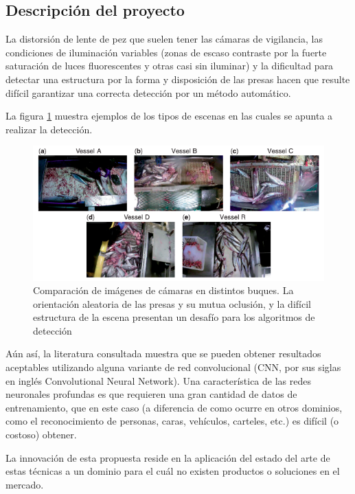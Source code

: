 \documentclass[11pt]{charter}
\begin{document}
\subsection{Descripción del proyecto}

La distorsión de lente de pez que suelen tener las cámaras de vigilancia, las condiciones de iluminación variables (zonas de escaso contraste por la fuerte saturación de luces fluorescentes y otras casi sin iluminar) y la dificultad para detectar una estructura por la forma y disposición de las presas hacen que resulte difícil garantizar una correcta detección por un método automático.

La figura \ref{fig:ejemplos_escenas} muestra ejemplos de los tipos de escenas en las cuales se apunta a realizar la detección.

\vspace{25px}

\begin{figure}[htpb]
\centering 
\includegraphics[width=.7\textwidth]{./Figuras/ejemplos_escenas.png}
\caption{Comparación de imágenes de cámaras en distintos buques. La orientación aleatoria de las presas y su mutua oclusión, y la difícil estructura de la escena presentan un desafío para los algoritmos de detección}
\label{fig:ejemplos_escenas}
\end{figure}

\vspace{25px}

Aún así, la literatura consultada muestra que se pueden obtener resultados aceptables utilizando alguna variante de red convolucional (CNN, por sus siglas en inglés Convolutional Neural Network). 
Una característica de las redes neuronales profundas es que requieren una gran cantidad de datos de entrenamiento, que en este caso (a diferencia de como ocurre en otros dominios, como el reconocimiento de personas, caras, vehículos, carteles, etc.) es difícil (o costoso) obtener.

La innovación de esta propuesta reside en la aplicación del estado del arte de estas técnicas a un dominio para el cuál no existen productos o soluciones en el mercado.
\end{document}
